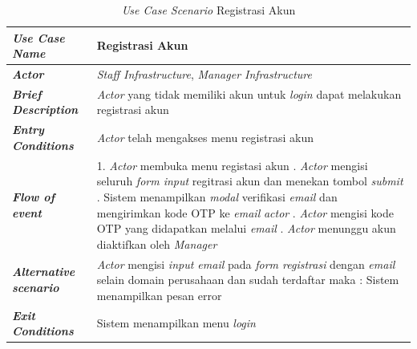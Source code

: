 \begin{longtable}{ |p{6cm}|p{8cm}|}
\caption{\textit{Use Case Scenario} Registrasi Akun}\label{tab:use-case-scenario-registrasi-akun} 
\\
\hline
\textbf{\textit{Use Case Name}}
&Registrasi Akun 
\\ \hline

\textbf{\textit{Actor}}
&\textit{Staff Infrastructure}, \textit{Manager Infrastructure} 
\\ \hline

\textbf{\textit{Brief Description}}
&\textit{Actor} yang tidak memiliki akun untuk \textit{login} dapat melakukan registrasi akun
\\ \hline

\textbf{\textit{Entry Conditions}}
&\textit{Actor} telah mengakses menu registrasi akun
\\ \hline

\textbf{\textit{Flow of event}}
&1. \textit{Actor} membuka menu registasi akun
\newline
2. \textit{Actor} mengisi seluruh \textit{form input} regitrasi akun dan menekan tombol \textit{submit}
\newline
3. Sistem menampilkan \textit{modal} verifikasi \textit{email} dan mengirimkan kode OTP ke \textit{email} \textit{actor}
\newline
4. \textit{Actor} mengisi kode OTP yang didapatkan melalui \textit{email}
\newline
5. \textit{Actor} menunggu akun diaktifkan oleh \textit{Manager}
\\ \hline

\textbf{\textit{Alternative scenario}}
&\textit{Actor} mengisi \textit{input email} pada \textit{form registrasi} dengan \textit{email} selain domain perusahaan dan sudah terdaftar maka : Sistem menampilkan pesan error
\\ \hline

\textbf{\textit{Exit Conditions}}
&Sistem menampilkan menu \textit{login}
\\ \hline
\end{longtable}

